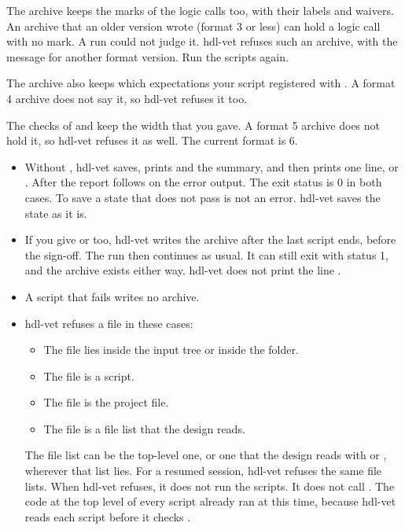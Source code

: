 The archive keeps the marks of the logic calls too, with their labels and waivers. An
archive that an older version wrote (format 3 or less) can hold a logic call with no mark.
A run could not judge it. hdl-vet refuses such an archive, with the message for another
format version. Run the scripts again.

The archive also keeps which expectations your script registered with .
A format 4 archive does not say it, so hdl-vet refuses it too.

The checks of  and  keep the width that
you gave. A format 5 archive does not hold it, so hdl-vet refuses it as well. The current
format is 6.

\begin{itemize}
\item Without , hdl-vet saves, prints  and the summary, and then
  prints one line,  or . After
   the report follows on the error output. The exit status is 0 in both
  cases. To save a state that does not pass is not an error. hdl-vet saves the state as
  it is.
\item If you give  or  too, hdl-vet writes the archive after the
  last script ends, before the sign-off. The run then continues as usual. It can still
  exit with status 1, and the archive exists either way. hdl-vet does not print the line
  .
\item A script that fails writes no archive.
\item hdl-vet refuses a  file in these cases:
  \begin{itemize}
  \item The file lies inside the input tree or inside the  folder.
  \item The file is a script.
  \item The file is the project file.
  \item The file is a file list that the design reads.
  \end{itemize}
  The file list can be the top-level one, or one that the design reads with  or
  , wherever that list lies. For a resumed session, hdl-vet refuses the same
  file lists. When hdl-vet refuses, it does not run the scripts. It does not call
  . The code at the top level of every script already ran at this time,
  because hdl-vet reads each script before it checks .
\end{itemize}

